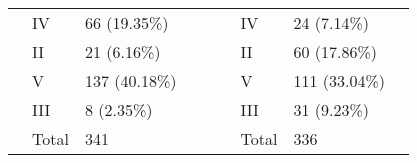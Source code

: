 \begin{table}[]
{\begin{tabular}{|l|l|l|l|l|l|l|l|l|}
 & IV & 66 (19.35\%) &  &  &  & IV & 24 (7.14\%) &  \\ \cline{2-3} \cline{7-8}
 & II & 21 (6.16\%) &  &  &  & II & 60 (17.86\%) &  \\ \cline{2-3} \cline{7-8}
 & V & 137 (40.18\%) &  &  &  & V & 111 (33.04\%) &  \\ \cline{2-3} \cline{7-8}
 & III & 8 (2.35\%) &  &  &  & III & 31 (9.23\%) &  \\ \cline{2-3} \cline{7-8}
 & Total & 341 &  &  &  & Total & 336 &  \\ \cline{1-4} \cline{6-9}
\end{tabular}
}
\label{table:chord_distribs3}
\end{table}


\newpage
